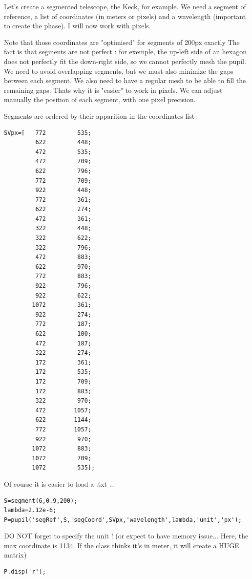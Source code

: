 \documentclass[12pt]{article}
\begin{document}
\begin{par}
Let's create a segmented telescope, the Keck, for example. We need a segment of reference, a list of coordinates (in meters or pixels) and a wavelength (important to create the phase). I will now work with pixels.
\end{par} \vspace{1em}
\begin{par}
Note that those coordinates are "optimised" for segments of 200px exactly The fact is that segments are not perfect : for exemple, the up-left side of an hexagon does not perfectly fit the down-right side, so we cannot perfectly mesh the pupil. We need to avoid overlapping segments, but we must also minimize the gaps between each segment. We also need to have a regular mesh to be able to fill the remaining gaps. Thats why it is "easier" to work in pixels. We can adjust  manually the position of each segment, with one pixel precision.
\end{par} \vspace{1em}
\begin{par}
Segments are ordered by their apparition in the coordinates list
\end{par} \vspace{1em}
\begin{verbatim}
SVpx=[   772         535;
         622         448;
         472         535;
         472         709;
         622         796;
         772         709;
         922         448;
         772         361;
         622         274;
         472         361;
         322         448;
         322         622;
         322         796;
         472         883;
         622         970;
         772         883;
         922         796;
         922         622;
        1072         361;
         922         274;
         772         187;
         622         100;
         472         187;
         322         274;
         172         361;
         172         535;
         172         709;
         172         883;
         322         970;
         472        1057;
         622        1144;
         772        1057;
         922         970;
        1072         883;
        1072         709;
        1072         535];
\end{verbatim}
\begin{par}
Of course it is easier to load a .txt ...
\end{par} \vspace{1em}
\begin{verbatim}
S=segment(6,0.9,200);
lambda=2.12e-6;
P=pupil('segRef',S,'segCoord',SVpx,'wavelength',lambda,'unit','px');
\end{verbatim}
\begin{par}
DO NOT forget to specify the unit ! (or expect to have memory issue... Here, the max coordinate is 1134. If the class thinks it's in meter, it will create a HUGE matrix)
\end{par} \vspace{1em}
\begin{verbatim}
P.disp('r');
\end{verbatim}
\end{document}
